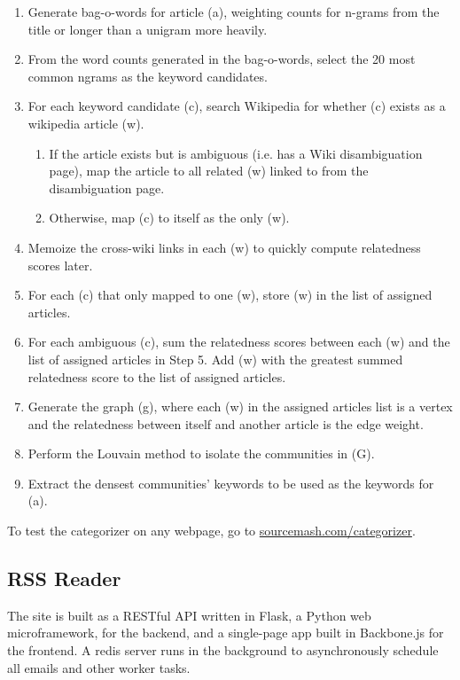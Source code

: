 \documentclass[11pt]{article}
\begin{document}
\begin{enumerate}

\item Generate bag-o-words for article (a), weighting counts for n-grams from the title or longer than a unigram more heavily.
\item From the word counts generated in the bag-o-words, select the 20 most common ngrams as the keyword candidates.
\item For each keyword candidate (c), search Wikipedia for whether (c) exists as a wikipedia article (w).
  \begin{enumerate}
  \item If the article exists but is ambiguous (i.e. has a Wiki disambiguation page), map the article to all related (w) linked to from the disambiguation page.
  \item Otherwise, map (c) to itself as the only (w).
  \end{enumerate}
\item Memoize the cross-wiki links in each (w) to quickly compute relatedness scores later.
\item For each (c) that only mapped to one (w), store (w) in the list of assigned articles.
\item For each ambiguous (c), sum the relatedness scores between each (w) and the list of assigned articles in Step 5. Add (w) with the greatest summed relatedness score to the list of assigned articles.
\item Generate the graph (g), where each (w) in the assigned articles list is a vertex and the relatedness between itself and another article is the edge weight.
\item Perform the Louvain method to isolate the communities in (G).
\item Extract the densest communities' keywords to be used as the keywords for (a).
\end{enumerate}

To test the categorizer on any webpage, go to \url{sourcemash.com/categorizer}.

\subsection{RSS Reader}

The site is built as a RESTful API written in Flask, a Python web microframework, for the backend, and a single-page app built in Backbone.js for the frontend. A redis server runs in the background to asynchronously schedule all emails and other worker tasks.
\end{document}

